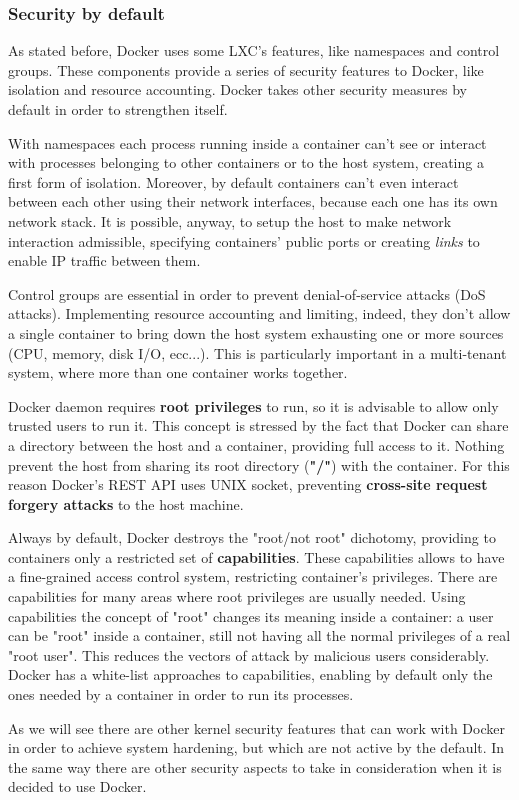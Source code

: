 \documentclass[a4paper,12pt]{article}
\begin{document}
\subsubsection{Security by default}

As stated before, Docker uses some LXC's features, like namespaces and control
groups. These components provide a series of security features to Docker, like
isolation and resource accounting. Docker takes other security measures by
default in order to strengthen itself.\par With namespaces each process running
inside a container can't see or interact with processes belonging to other
containers or to the host system, creating a first form of isolation. Moreover,
by default containers can't even interact between each other using their network
interfaces, because each one has its own network stack. It is possible, anyway,
to setup the host to make network interaction admissible, specifying containers'
public ports or creating \textit{links}\cite{legacy_container_links} to enable
IP traffic between them.\par Control groups are essential in order to prevent
denial-of-service attacks (DoS attacks). Implementing resource accounting and
limiting, indeed,  they don't allow a single container to bring down the host
system exhausting one or more sources (CPU, memory, disk I/O, ecc...). This is
particularly important in a multi-tenant system, where more than one container
works together. \par Docker daemon requires \textbf{root privileges} to run, so
it is advisable to allow only trusted users to run it. This concept is stressed
by the fact that Docker can share a directory between the host and a container,
providing full access to it. Nothing prevent the host from sharing its root
directory (\textbf{"/"}) with the container. For this reason Docker's REST API
uses UNIX socket, preventing \textbf{cross-site request forgery attacks} to the
host machine. \par Always by default, Docker destroys the "root/not root"
dichotomy, providing to containers only a restricted set of
\textbf{capabilities}. These capabilities allows to have a fine-grained access
control system, restricting container's privileges. There are capabilities for
many areas where root privileges are usually needed. Using capabilities the
concept of "root" changes its meaning inside a container: a user can be "root"
inside a container, still not having all the normal privileges of a real "root
user". This reduces the vectors of attack by malicious users considerably.
Docker has a white-list approaches to capabilities, enabling by default only the
ones needed by a container in order to run its processes. \par As we will see
there are other kernel security features that can work with Docker in order to
achieve system hardening, but which are not active by the default. In the same
way there are other security aspects to take in consideration when it is decided
to use Docker. \cite{docker_security_by_default}
\end{document}
